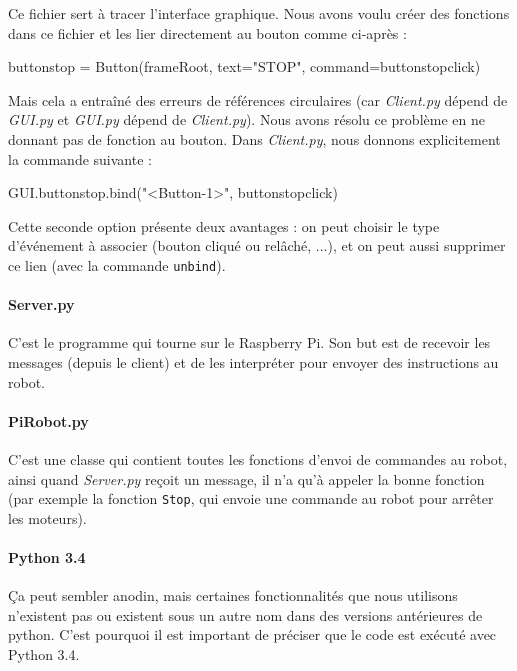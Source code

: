 \documentclass[12pt,a4paper]{report}
\begin{document}
Ce fichier sert à tracer l'interface graphique. Nous avons voulu créer des fonctions dans ce fichier et les lier directement au bouton comme ci-après :

\begin{verbatimtab}[3]
buttonstop = Button(frameRoot, text="STOP", command=buttonstopclick)
\end{verbatimtab}

Mais cela a entraîné des erreurs de références circulaires (car \textit{Client.py} dépend de \textit{GUI.py} et \textit{GUI.py} dépend de \textit{Client.py}). Nous avons résolu ce problème en ne donnant pas de fonction au bouton. Dans \textit{Client.py}, nous donnons explicitement la commande suivante :

\begin{verbatimtab}[3]
GUI.buttonstop.bind("<Button-1>", buttonstopclick)
\end{verbatimtab}

Cette seconde option présente deux avantages : on peut choisir le type d'événement à associer (bouton cliqué ou relâché, ...), et on peut aussi supprimer ce lien (avec la commande \verb=unbind=).

\paragraph{Server.py}

C'est le programme qui tourne sur le Raspberry Pi. Son but est de recevoir les messages (depuis le client) et de les interpréter pour envoyer des instructions au robot.

\paragraph{PiRobot.py}

C'est une classe qui contient toutes les fonctions d'envoi de commandes au robot, ainsi quand \textit{Server.py} reçoit un message, il n'a qu'à appeler la bonne fonction (par exemple la fonction \verb=Stop=, qui envoie une commande au robot pour arrêter les moteurs).

\paragraph{Python 3.4}

Ça peut sembler anodin, mais certaines fonctionnalités que nous utilisons n'existent pas ou existent sous un autre nom dans des versions antérieures de python. C'est pourquoi il est important de préciser que le code est exécuté avec Python 3.4.
\end{document}
